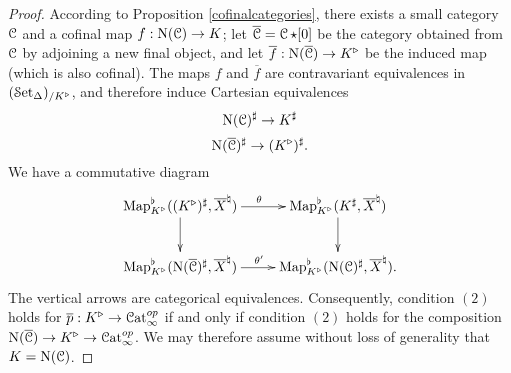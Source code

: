 \begin{proof}
According to Proposition \ref{cofinalcategories}, there exists a small category $\operatorname{\mathcal{C}}$ and a cofinal map $f: \operatorname{N}(\operatorname{\mathcal{C}}) \rightarrow K$; let $\overline{\operatorname{\mathcal{C}}}= \operatorname{\mathcal{C}} \star [0]$ be the category obtained from $\operatorname{\mathcal{C}}$ by adjoining a new final object, and let
$\overline{f}: \operatorname{N}(\overline{\operatorname{\mathcal{C}}}) \rightarrow K^{\triangleright}$ be the induced map (which is also cofinal). The maps $f$ and $\overline{f}$ are contravariant equivalences in
$(\operatorname{\mathcal{S}et_{\Delta}})_{/ K^{\triangleright} }$, and therefore induce Cartesian equivalences
$$ \operatorname{N}(\operatorname{\mathcal{C}})^{\sharp} \rightarrow K^{\sharp}$$
$$ \operatorname{N}(\overline{\operatorname{\mathcal{C}}})^{\sharp} \rightarrow (K^{\triangleright})^{\sharp}.$$
We have a commutative diagram
$$ \xymatrix{ \bHom^{\flat}_{K^{\triangleright}}( (K^{\triangleright})^{\sharp}, 
\overline{X}^{\natural} ) \ar[r]^{\theta} \ar[d] & 
\bHom^{\flat}_{K^{\triangleright}}( K^{\sharp}, 
\overline{X}^{\natural} ) \ar[d] \\
\bHom^{\flat}_{K^{\triangleright}}( \Nerve(\overline{\calC})^{\sharp}, 
\overline{X}^{\natural} ) \ar[r]^{\theta'} & 
\bHom^{\flat}_{K^{\triangleright}}( \Nerve(\calC)^{\sharp}, 
\overline{X}^{\natural} ). }$$
The vertical arrows are categorical equivalences. Consequently, condition $(2)$ holds for 
$\overline{p}: K^{\triangleright} \rightarrow \operatorname{\mathcal{C}at}_{\infty}^{op}$ if and only if condition $(2)$
holds for the composition $\operatorname{N}(\overline{\operatorname{\mathcal{C}}}) \rightarrow K^{\triangleright} \rightarrow
\operatorname{\mathcal{C}at}_{\infty}^{op}$. We may therefore assume without loss of generality that
$K = \operatorname{N}(\operatorname{\mathcal{C}})$. 


\end{proof}
